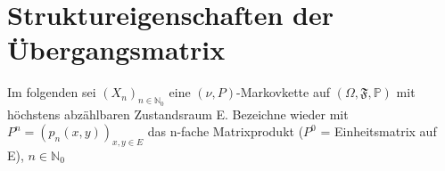 \vspace{15cm}
\section{Struktureigenschaften der Übergangsmatrix}
Im folgenden sei $(X_{n})_{n \in \mathbb{N}_{0}}$ eine $(\nu,P)$-Markovkette auf $(\Omega, \mathfrak{F},\mathbb{P})$ mit höchstens abzählbaren Zustandsraum E. Bezeichne wieder mit $P^{n} = (p_{n}(x,y))_{x,y \in E}$ das n-fache Matrixprodukt ($P^{0}$ = Einheitsmatrix auf E), $n \in \mathbb{N}_{0}$